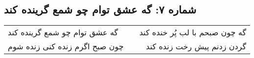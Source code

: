 \begin{center}
\section*{شماره ۷: گه عشق توام چو شمع گرینده کند}
\label{sec:007}
\begin{longtable}{l p{0.5cm} r}
گه عشق توام چو شمع گرینده کند
&&
گه چون صبحم با لب پُر خنده کند
\\
چون صبح اگرم زنده کنی زنده شوم
&&
گردن زدنم پیش رخت زنده کند
\\
\end{longtable}
\end{center}
